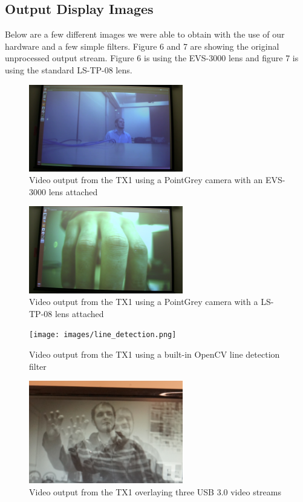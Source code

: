 \newpage
\subsection{Output Display Images}

Below are a few different images we were able to obtain with the use of our hardware and a few simple filters. Figure 6 and 7 are showing the original unprocessed output stream. Figure 6 is using the EVS-3000 lens and figure 7 is using the standard LS-TP-08 lens.\\

   \begin{figure}[!ht]
	  \centering
		    \includegraphics[width=0.6\textwidth]{images/normal_image.png}
		      \caption{Video output from the TX1 using a PointGrey camera with an EVS-3000 lens attached}
				\end{figure}
				
\begin{figure}[!ht]
	  \centering
		    \includegraphics[width=0.6\textwidth]{images/green_image.png}
		      \caption{Video output from the TX1 using a PointGrey camera with a LS-TP-08 lens attached}
				\end{figure}

\begin{figure}[!ht]
	  \centering
		    \texttt{[image: images/line\_detection.png]}
		      \caption{Video output from the TX1 using a built-in OpenCV line detection filter}
				\end{figure}
 				
\begin{figure}[!ht]
	  \centering
		    \includegraphics[width=0.6\textwidth]{images/3_normal.png}
		      \caption{Video output from the TX1 overlaying three USB 3.0 video streams}
				\end{figure}
			
